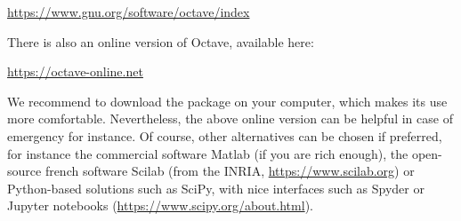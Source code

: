 \documentclass{article}
\begin{document}
\medskip

\begin{center}
\url{https://www.gnu.org/software/octave/index}
\end{center}

\medskip

\noindent There is also an online version of Octave, available here:

\medskip

\begin{center}
\url{https://octave-online.net}    
\end{center}

\medskip

We recommend to download the package on your computer, which makes its use more comfortable. Nevertheless, the above online version can be helpful in case of emergency for instance.
Of course, other alternatives can be chosen
if preferred, for instance the commercial software Matlab (if you are rich enough), the open-source french software Scilab (from the INRIA, \url{https://www.scilab.org}) or Python-based solutions such as SciPy, with nice interfaces such as Spyder or Jupyter notebooks (\url{https://www.scipy.org/about.html}).
\end{document}
